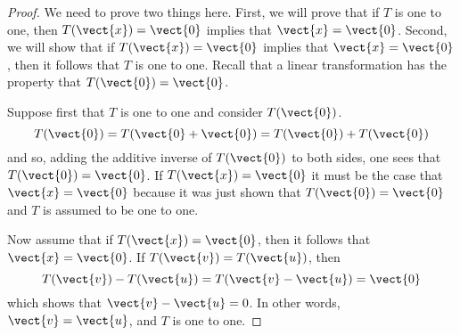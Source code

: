 \begin{proof}
We need to prove two things here. First, we will prove that if $T$ is one to one, then
$T(\vect{x}) = \vect{0}$ implies that $\vect{x}=\vect{0}$. Second, we will show that if $T(\vect{x})=\vect{0}$ implies that $\vect{x}=\vect{0}$, then
it follows that $T$ is one to one. Recall that a linear transformation has the property that $T(\vect{0}) = \vect{0}$.


Suppose first that $T$ is one to one and consider $T(\vect{0})$.
\begin{equation*}
T(\vect{0})=T(\vect{0}+\vect{0}) =T(\vect{0})+T(\vect{0})
\end{equation*}
and so, adding the additive inverse of $T(\vect{0})$ to both sides, one sees
that $T(\vect{0})=\vect{0}$. If $T(\vect{x})=\vect{0}$ it must be the
case that $\vect{x}=\vect{0}$ because it was just shown that $T(\vect{0})=\vect{0}$ and $T$ is assumed to be one to one.

Now assume that if $T(\vect{x})=\vect{0}$, then it follows that $\vect{x}=\vect{0}$. If $T(\vect{v})=T(\vect{u})$, then
\[
T(\vect{v})-T(\vect{u})=T(\vect{v}-\vect{u}) =\vect{0}
\]
which shows that $\vect{v}-\vect{u}=0$. In other words, $\vect{v}=\vect{u}$, and $T$ is one to one.
\end{proof}

